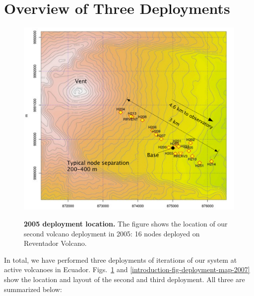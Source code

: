 \section{Overview of Three Deployments}

\begin{figure}[t]
\begin{center}
\includegraphics[width=0.8\hsize]{./5-evaluation/figs/pics/reventador-map.pdf}\\
\end{center}
\caption{\textbf{2005 deployment location.} The figure shows the location of
our second volcano deployment in 2005: 16 nodes deployed on Reventador
Volcano.}
\label{introduction-fig-deployment-map-2005}
\end{figure}

In total, we have performed three deployments of iterations of our system at
active volcanoes in Ecuador. Figs.~\ref{introduction-fig-deployment-map-2005}
and \ref{introduction-fig-deployment-map-2007} show the location and layout
of the second and third deployment. All three are summarized below:

